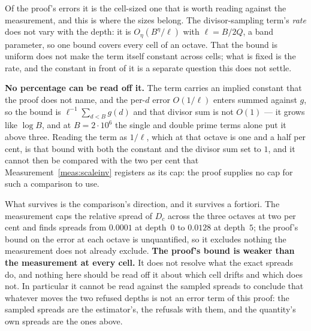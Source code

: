\documentclass[11pt,a4paper]{article}
\theoremstyle{plain}
\theoremstyle{definition}
\theoremstyle{remark}
\begin{document}
Of the proof's errors it is the cell-sized one that is worth reading
against the measurement, and this is where the sizes belong. The
divisor-sampling term's \emph{rate} does not vary with the depth: it is
$O_\eta(B^{\eta}/\ell)$ with $\ell=B/2Q$, a band parameter, so one bound
covers every cell of an octave. That the bound is uniform does not make
the term itself constant across cells; what is fixed is the rate, and
the constant in front of it is a separate question this does not settle.

\textbf{No percentage can be read off it.} The term carries an implied
constant that the proof does not name, and the per-$d$ error $O(1/\ell)$
enters summed against $g$, so the bound is $\ell^{-1}\sum_{d<B}g(d)$
and that divisor sum is not $O(1)$ --- it grows like $\log B$, and at
$B=2\cdot10^6$ the single and double prime terms alone put it above
three. Reading the term as $1/\ell$, which at that octave is one and a
half per cent, is that bound with both the constant and the divisor
sum set to $1$, and it cannot then be compared with the two per cent
that Measurement~\ref{meas:scaleinv} registers as its cap: the proof
supplies no cap for such a comparison to use.

What survives is the comparison's direction, and it survives a
fortiori. The measurement caps the relative spread of $D_c$ across the
three octaves at two per cent and finds spreads from $0.0001$ at
depth~$0$ to $0.0128$ at depth~$5$; the proof's bound on the error at
each octave is unquantified, so it excludes nothing the measurement
does not already exclude. \textbf{The proof's bound is weaker than the
measurement at every cell.} It does
not resolve what the exact spreads do, and nothing here should be read
off it about which cell drifts and which does not. In particular it
cannot be read against the sampled spreads to conclude that whatever
moves the two refused depths is not an error term of this proof: the
sampled spreads are the estimator's, the refusals with them, and the
quantity's own spreads are the ones above.
\end{document}
